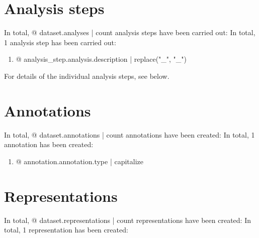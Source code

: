 
\section{Analysis steps}

In total, {@ dataset.analyses | count } analysis steps have been carried out:
In total, 1 analysis step has been carried out:

\begin{enumerate}
\item {@ analysis_step.analysis.description | replace("_", "\_") }
\end{enumerate}

For details of the individual analysis steps, see below.




\section{Annotations}

In total, {@ dataset.annotations | count } annotations have been created:
In total, 1 annotation has been created:

\begin{enumerate}
\item {@ annotation.annotation.type | capitalize }
\end{enumerate}





\section{Representations}

In total, {@ dataset.representations | count } representations have been created:
In total, 1 representation has been created:

